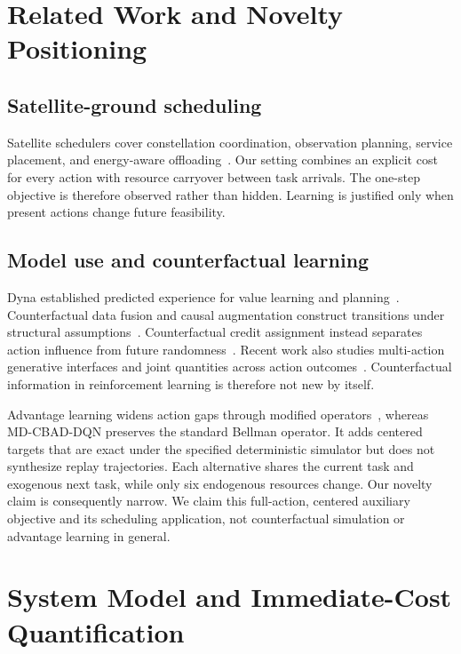 \documentclass[11pt]{article}
\newcommand{\method}{MD-CBAD-DQN\xspace}
\begin{document}
\section{Related Work and Novelty Positioning}

\subsection{Satellite-ground scheduling}

Satellite schedulers cover constellation coordination, observation planning, service placement, and energy-aware offloading~\cite{RN8,RN9,RN10,RN20,RN22,RN23,RN27,RN28}. Our setting combines an explicit cost for every action with resource carryover between task arrivals. The one-step objective is therefore observed rather than hidden. Learning is justified only when present actions change future feasibility.

\subsection{Model use and counterfactual learning}

Dyna established predicted experience for value learning and planning~\cite{sutton1991dyna}. Counterfactual data fusion and causal augmentation construct transitions under structural assumptions~\cite{forney2017counterfactual,armengol2024caiac}. Counterfactual credit assignment instead separates action influence from future randomness~\cite{mesnard2021counterfactual}. Recent work also studies multi-action generative interfaces and joint quantities across action outcomes~\cite{kaya2026joint}. Counterfactual information in reinforcement learning is therefore not new by itself.

Advantage learning widens action gaps through modified operators~\cite{bellemare2016gap}, whereas \method preserves the standard Bellman operator. It adds centered targets that are exact under the specified deterministic simulator but does not synthesize replay trajectories. Each alternative shares the current task and exogenous next task, while only six endogenous resources change. Our novelty claim is consequently narrow. We claim this full-action, centered auxiliary objective and its scheduling application, not counterfactual simulation or advantage learning in general.

\section{System Model and Immediate-Cost Quantification}
\label{sec:system}
\end{document}
